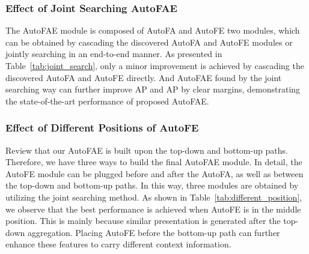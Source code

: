 \documentclass[sigconf]{acmart}
\begin{document}
\subsubsection{Effect of Joint Searching AutoFAE}
The AutoFAE module is composed of AutoFA and AutoFE two modules, which can be obtained by cascading the discovered AutoFA and AutoFE modules or jointly searching in an end-to-end manner. 
As presented in Table~\ref{tab:joint_search}, only a minor improvement is achieved by cascading the discovered AutoFA and AutoFE directly. And AutoFAE found by the joint searching way can further improve AP and AP by clear margins, demonstrating the state-of-the-art performance of proposed AutoFAE.



\begin{table}[!t]
    \centering
    \caption{The effect of searching method for the AutoFAE.}
    \label{tab:joint_search}
\end{table}


\subsubsection{Effect of Different Positions of AutoFE}
Review that our AutoFAE is built upon the top-down and bottom-up paths. Therefore, we have three ways to build the final AutoFAE module. In detail, the AutoFE module can be plugged before and after the AutoFA, as well as between the top-down and bottom-up paths. In this way, three modules are obtained by utilizing the joint searching method. As shown in Table~\ref{tab:different_position}, we observe that the best performance is achieved when AutoFE is in the middle position. This is mainly because similar presentation is generated after the top-down aggregation. Placing AutoFE before the bottom-up path can further enhance these features to carry different context information.
\end{document}
